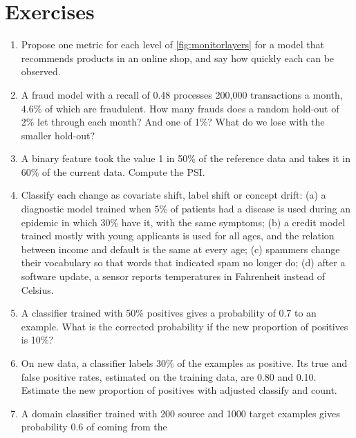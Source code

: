 \section*{Exercises}

\begin{enumerate}[label=\textbf{6.\arabic*},ref=6.\arabic*,leftmargin=*,itemsep=6pt]
  \item\label{exr6:plan} Propose one metric for each level of \cref{fig:monitorlayers} for a model that recommends products in an
        online shop, and say how quickly each can be observed.
  \item\label{exr6:holdout} A fraud model with a recall of 0.48 processes 200,000 transactions a month, 4.6\% of which are fraudulent.
        How many frauds does a random hold-out of 2\% let through each month? And one of 1\%? What do we lose with the smaller hold-out?
  \item\label{exr6:psi} A binary feature took the value 1 in 50\% of the reference data and takes it in 60\% of the current data.
        Compute the PSI.
  \item\label{exr6:types} Classify each change as covariate shift, label shift or concept drift: (a) a diagnostic model trained when
        5\% of patients had a disease is used during an epidemic in which 30\% have it, with the same symptoms; (b) a credit model
        trained mostly with young applicants is used for all ages, and the relation between income and default is the same at every
        age; (c) spammers change their vocabulary so that words that indicated spam no longer do; (d) after a software update, a
        sensor reports temperatures in Fahrenheit instead of Celsius.
  \item\label{exr6:saerens} A classifier trained with 50\% positives gives a probability of 0.7 to an example. What is the corrected
        probability if the new proportion of positives is 10\%?
  \item\label{exr6:acc} On new data, a classifier labels 30\% of the examples as positive. Its true and false positive rates, estimated on
        the training data, are 0.80 and 0.10. Estimate the new proportion of positives with adjusted classify and count.
  \item\label{exr6:weights} A domain classifier trained with 200 source and 1000 target examples gives probability 0.6 of coming from the

\end{enumerate}
